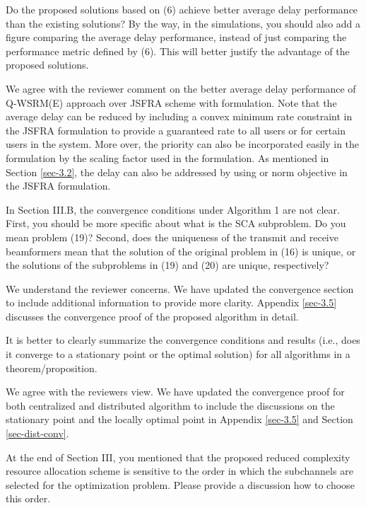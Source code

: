  Do the proposed solutions based on (6) achieve better average delay performance than the existing solutions? By the way, in the simulations, you should also add a figure comparing the average delay performance, instead of just comparing the performance metric defined by (6). This will better justify the advantage of the proposed solutions.

\resp We agree with the reviewer comment on the better average delay performance of Q-WSRM(E) approach over JSFRA scheme with  formulation. Note that the average delay can be reduced by including a convex minimum rate constraint in the JSFRA formulation to provide a guaranteed rate to all users or for certain users in the system. More over, the priority can also be incorporated easily in the formulation by the scaling factor  used in the formulation. As mentioned in Section \ref{sec-3.2}, the delay can also be addressed by using  or  norm objective in the JSFRA formulation.

 In Section III.B, the convergence conditions under Algorithm 1 are not clear. First, you should be more specific about what is the SCA subproblem. Do you mean problem (19)? Second, does the uniqueness of the transmit and receive beamformers mean that the solution of the original problem in (16) is unique, or the solutions of the subproblems in (19) and (20) are unique, respectively?

\resp We understand the reviewer concerns. We have updated the convergence section to include additional information to provide more clarity. Appendix \ref{sec-3.5} discusses the convergence proof of the proposed algorithm in detail.

 It is better to clearly summarize the convergence conditions and results (i.e., does it converge to a stationary point or the optimal solution) for all algorithms in a theorem/proposition.

\resp We agree with the reviewers view. We have updated the convergence proof for both centralized and distributed algorithm to include the discussions on the stationary point and the locally optimal point in Appendix \ref{sec-3.5} and Section \ref{sec-dist-conv}.

 At the end of Section III, you mentioned that the proposed reduced complexity resource allocation scheme is sensitive to the order in which the subchannels are selected for the optimization problem. Please provide a discussion how to choose this order.

